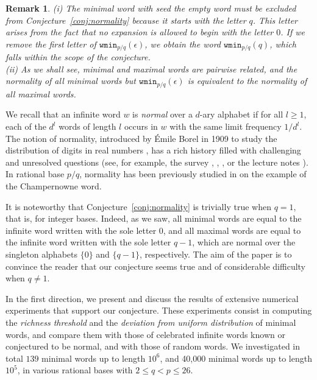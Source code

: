 \documentclass{template_arxiv}
\newtheorem{remark}[theorem]{Remark}
\numberwithin{equation}{section}
\newcommand{\eps}{\epsilon}
\newcommand{\wmin}{\mathtt{wmin}}
\begin{document}
\begin{remark}
	(i) The minimal word with seed the empty word must be excluded from Conjecture~\ref{conj:normality} because it starts with the letter $q$. This letter arises from the fact that no expansion is allowed to begin with the letter $0$. If we remove the first letter of $\wmin_{p/q}(\eps)$, we obtain the word $\wmin_{p/q}(q)$, which falls within the scope of the conjecture.
\\
(ii) As we shall see, minimal and maximal words are pairwise related, and the normality of all minimal words but $\wmin_{p/q}(\eps)$ is equivalent to the normality of all maximal words. 
\end{remark}

We recall that an infinite word $w$ is \emph{normal} over a $d$-ary alphabet if for all $l\geq1$, each of the $d^l$ words of length $l$ occurs in $w$ with the same limit frequency $1/d^l$.
The notion of normality, introduced by \'Emile Borel in 1909 to study the distribution of digits in real numbers \cite{Bor09}, has a rich history filled with challenging and unresolved questions (see, for example, the survey \cite{Que06}, \cite[Chapter~4]{BB08}, \cite[Chapters~4--6]{Bug12}, or the lecture notes \cite{BC18}). In rational base $p/q$, normality has been previously studied in \cite{MST13} on the example of the Champernowne word. 



\medskip

It is noteworthy that Conjecture~\ref{conj:normality} is trivially true when $q=1$, that is, for integer bases. Indeed, as we saw, all minimal words are equal to the infinite word written with the sole letter $0$, and all maximal words are equal to the infinite word
 written with the sole letter $q-1$, which are normal over the singleton alphabets $\{0\}$ and $\{q-1\}$, respectively. 
 The aim of the paper is to convince the reader that our conjecture seems true and of considerable difficulty when $q\neq 1$.
 
 In the first direction, we present and discuss the results of extensive numerical experiments that support our conjecture. These experiments consist in computing the  \emph{richness threshold} and the \emph{deviation from uniform distribution} of minimal words, and compare them with those of celebrated infinite words known or conjectured to be normal, and with those of random words.
 We investigated in total $139$ minimal words up to length $10^6$, and 40,000 minimal words up to length $10^5$, in various rational bases with $2\leq q < p\leq 26$. 
 
\end{document}
